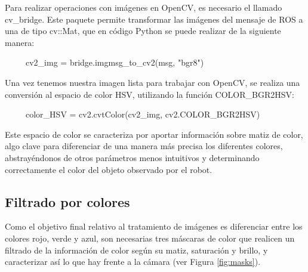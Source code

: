 \documentclass[12pt,spanish,chapterprefix, numbers=noenddot]{book}
\numberwithin{equation}{section}
\numberwithin{figure}{section}
\begin{document}
Para realizar operaciones con imágenes en OpenCV, es necesario el llamado cv\_bridge. Este paquete permite transformar las imágenes del mensaje de ROS a una de tipo cv::Mat, que en código Python se puede realizar de la siguiente manera: 
    
\ \ \ \ \ cv2\_img = bridge.imgmsg\_to\_cv2(msg, "bgr8")

Una vez tenemos nuestra imagen lista para trabajar con OpenCV, se realiza una conversión al espacio de color HSV, utilizando la función COLOR\_BGR2HSV:

\ \ \ \ \ color\_HSV = cv2.cvtColor(cv2\_img, cv2.COLOR\_BGR2HSV)

Este espacio de color se caracteriza por aportar información sobre matiz de color, algo clave para diferenciar de una manera más precisa los diferentes colores, abstrayéndonos de otros parámetros menos intuitivos y determinando correctamente el color del objeto observado por el robot. 

\subsection{Filtrado por colores}

Como el objetivo final relativo al tratamiento de imágenes es diferenciar entre los colores rojo, verde y azul, son necesarias tres máscaras de color que realicen un filtrado de la información de color según su matiz, saturación y brillo, y caracterizar así lo que hay frente a la cámara (ver Figura \ref{fig:masks}).
\end{document}
